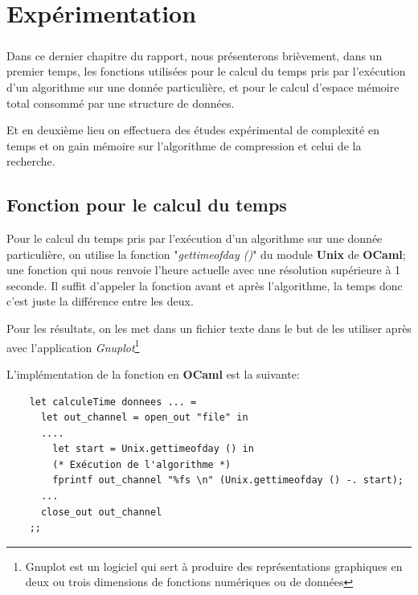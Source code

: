 \chapter{Expérimentation}
\paragraph{}
Dans ce dernier chapitre du rapport, nous présenterons brièvement, dans un premier temps, les fonctions utilisées pour le calcul du temps pris par l’exécution d’un algorithme sur une donnée particulière, et pour le calcul d’espace mémoire total consommé par une structure de données. 
    
Et en deuxième lieu on effectuera des études expérimental de complexité en temps et on gain mémoire sur l'algorithme de compression et celui de la recherche.   

\section{Fonction pour le calcul du temps}
    Pour le calcul du temps pris par l'exécution d'un algorithme sur une donnée particulière, on utilise la fonction "\textit{gettimeofday ()}" du module \textbf{Unix} \cite{refUnix} de \textbf{OCaml}; une fonction qui nous renvoie l'heure actuelle avec une résolution supérieure à 1 seconde. Il suffit d'appeler la fonction avant et après l'algorithme, la temps donc c'est juste la différence entre les deux.
    
    Pour les résultats, on les met dans un fichier texte dans le but de les utiliser après avec l'application \textit{Gnuplot}\footnote{Gnuplot est un logiciel qui sert à produire des représentations graphiques en deux ou trois dimensions de fonctions numériques ou de données}
    
    L'implémentation de la fonction en \textbf{OCaml} est la suivante:
    \begin{verbatim} 
    let calculeTime donnees ... = 
      let out_channel = open_out "file" in
      .... 
        let start = Unix.gettimeofday () in 
        (* Exécution de l'algorithme *)
        fprintf out_channel "%fs \n" (Unix.gettimeofday () -. start); 
      ...
      close_out out_channel
    ;;
    \end{verbatim}
    
    
